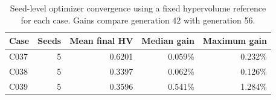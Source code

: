 \begin{table}[t]
\centering\small
\caption{Seed-level optimizer convergence using a fixed hypervolume reference for each case. Gains compare generation 42 with generation 56.}
\label{tab:optimizer_convergence}
\begin{tabular}{lrrrr}
\toprule
Case & Seeds & Mean final HV & Median gain & Maximum gain \\
\midrule
C037 & 5 & 0.6201 & 0.059\% & 0.232\% \\
C038 & 5 & 0.3397 & 0.062\% & 0.126\% \\
C039 & 5 & 0.3596 & 0.541\% & 1.284\% \\
\bottomrule
\end{tabular}
\end{table}
